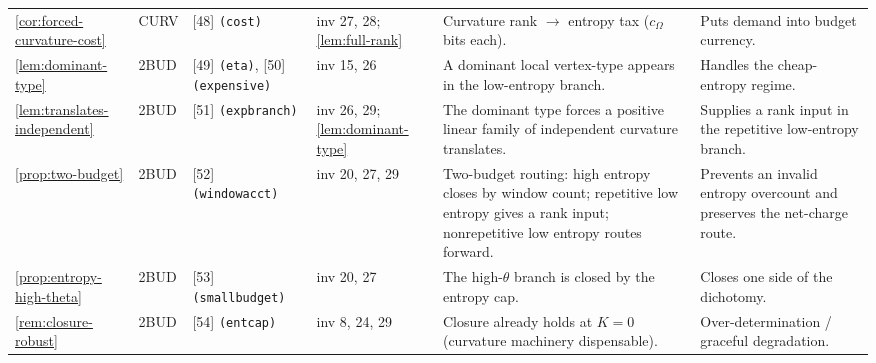 \documentclass[11pt]{article}
\begin{document}
{\begin{longtable}{L{0.10\textwidth} C{0.045\textwidth} L{0.13\textwidth} L{0.135\textwidth} L{0.28\textwidth} L{0.20\textwidth}}
\cref{cor:forced-curvature-cost} & CURV & [48] \texttt{(cost)} & inv 27, 28; \cref{lem:full-rank} & Curvature rank $\to$ entropy tax ($c_\Omega$ bits each). & Puts demand into budget currency. \\
\cref{lem:dominant-type} & 2BUD & [49] \texttt{(eta)}, [50] \texttt{(expensive)} & inv 15, 26 & A dominant local vertex-type appears in the low-entropy branch. & Handles the cheap-entropy regime. \\
\cref{lem:translates-independent} & 2BUD & [51] \texttt{(expbranch)} & inv 26, 29; \cref{lem:dominant-type} & The dominant type forces a positive linear family of independent curvature translates. & Supplies a rank input in the repetitive low-entropy branch. \\
\cref{prop:two-budget} & 2BUD & [52] \texttt{(windowacct)} & inv 20, 27, 29 & Two-budget routing: high entropy closes by window count; repetitive low entropy gives a rank input; nonrepetitive low entropy routes forward. & Prevents an invalid entropy overcount and preserves the net-charge route. \\
\cref{prop:entropy-high-theta} & 2BUD & [53] \texttt{(smallbudget)} & inv 20, 27 & The high-$\theta$ branch is closed by the entropy cap. & Closes one side of the dichotomy. \\
\cref{rem:closure-robust} & 2BUD & [54] \texttt{(entcap)} & inv 8, 24, 29 & Closure already holds at $K=0$ (curvature machinery dispensable). & Over-determination / graceful degradation. \\
\bottomrule
\end{longtable}
}
\end{document}
